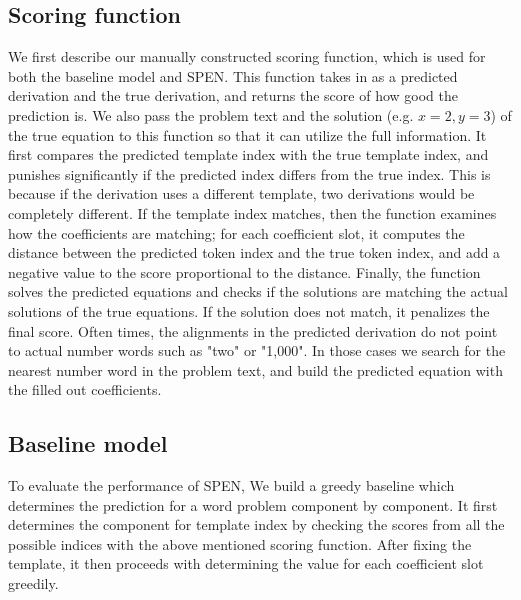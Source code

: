 \documentclass[11pt,letterpaper]{article}
\begin{document}
\subsection{Scoring function}
We first describe our manually constructed scoring function, which is used for both the baseline model and SPEN. This function takes in as a predicted derivation and the true derivation, and returns the score of how good the prediction is. We also pass the problem text and the solution (e.g. $x=2, y=3$) of the true equation to this function so that it can utilize the full information. It first compares the predicted template index with the true template index, and punishes significantly if the predicted index differs from the true index. This is because if the derivation uses a different template, two derivations would be completely different. If the template index matches, then the function examines how the coefficients are matching; for each coefficient slot, it computes the distance between the predicted token index and the true token index, and add a negative value to the score proportional to the distance. Finally, the function solves the predicted equations and checks if the solutions are matching the actual solutions of the true equations. If the solution does not match, it penalizes the final score. Often times, the alignments in the predicted derivation do not point to actual number words such as "two" or "1,000". In those cases we search for the nearest number word in the problem text, and build the predicted equation with the filled out coefficients.
\subsection{Baseline model}
To evaluate the performance of SPEN, We build a greedy baseline which determines the prediction for a word problem component by component. It first determines the component for template index by checking the scores from all the possible indices with the above mentioned scoring function. After fixing the template, it then proceeds with determining the value for each coefficient slot greedily.
\end{document}
